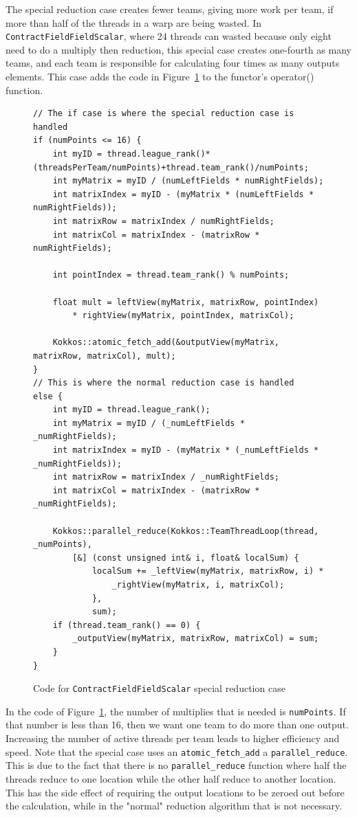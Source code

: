 The special reduction case creates fewer teams, giving more work per team, if
more than half of the threads in a warp are being wasted. In
\texttt{ContractFieldFieldScalar}, where 24 threads can wasted because only
eight need to do a multiply then reduction, this special case creates one-fourth
as many teams, and each team is responsible for calculating four times as many
outputs elements.  This case adds the code in
Figure~\ref{lst:ContractFieldFieldScalarReductionSpecialCase} to the functor's
operator() function.

\begin{figure}[!ht]
    \begin{lstlisting}
// The if case is where the special reduction case is handled
if (numPoints <= 16) {	
	int myID = thread.league_rank()*(threadsPerTeam/numPoints)+thread.team_rank()/numPoints;
	int myMatrix = myID / (numLeftFields * numRightFields);
	int matrixIndex = myID - (myMatrix * (numLeftFields * numRightFields));
	int matrixRow = matrixIndex / numRightFields;
	int matrixCol = matrixIndex - (matrixRow * numRightFields);

	int pointIndex = thread.team_rank() % numPoints;

	float mult = leftView(myMatrix, matrixRow, pointIndex) 
		* rightView(myMatrix, pointIndex, matrixCol);

	Kokkos::atomic_fetch_add(&outputView(myMatrix, matrixRow, matrixCol), mult);
}
// This is where the normal reduction case is handled
else {
	int myID = thread.league_rank();
	int myMatrix = myID / (_numLeftFields * _numRightFields);
	int matrixIndex = myID - (myMatrix * (_numLeftFields * _numRightFields));
	int matrixRow = matrixIndex / _numRightFields;
	int matrixCol = matrixIndex - (matrixRow * _numRightFields);

	Kokkos::parallel_reduce(Kokkos::TeamThreadLoop(thread, _numPoints),
		[&] (const unsigned int& i, float& localSum) {
			localSum += _leftView(myMatrix, matrixRow, i) *
				_rightView(myMatrix, i, matrixCol);
			},
			sum);
	if (thread.team_rank() == 0) {
		_outputView(myMatrix, matrixRow, matrixCol) = sum;
	}
}
    \end{lstlisting}
\caption{Code for \texttt{ContractFieldFieldScalar} special reduction case
\label{lst:ContractFieldFieldScalarReductionSpecialCase}} 
\end{figure}

In the code of Figure~\ref{lst:ContractFieldFieldScalarReductionSpecialCase},
the number of multiplies that is needed is \texttt{numPoints}. If that number is less
than 16, then we want one team to do more than one output. Increasing the number
of active threads per team leads to higher efficiency and speed.  Note that the
special case uses an \texttt{atomic\_fetch\_add} a \texttt{parallel\_reduce}.
This is due to the fact that there is no \texttt{parallel\_reduce} function
where half the threads reduce to one location while the other half reduce to
another location. This has the side effect of requiring the output locations to
be zeroed out before the calculation, while in the "normal" reduction algorithm
that is not necessary. 

